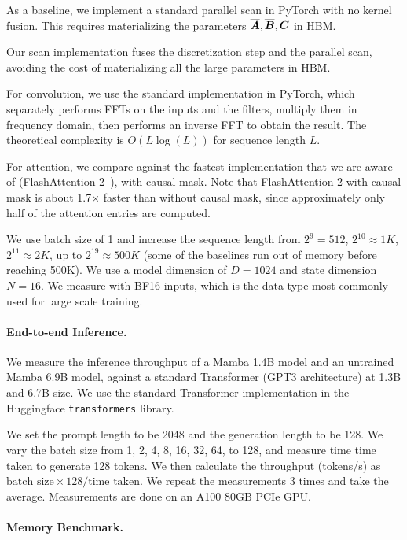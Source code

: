 As a baseline, we implement a standard parallel scan in PyTorch with no kernel fusion. This requires materializing the parameters $\overline{\bm{A}}, \overline{\bm{B}}, \bm{C}$ in HBM.

Our scan implementation fuses the discretization step and the parallel scan, avoiding the cost of materializing all the large parameters in HBM.

For convolution, we use the standard implementation in PyTorch, which separately performs FFTs on the inputs and the filters, multiply them in frequency domain, then performs an inverse FFT to obtain the result. The theoretical complexity is $O(L \log (L))$ for sequence length $L$.

For attention, we compare against the fastest implementation that we are aware of (FlashAttention-2~\citep{dao2023flashattention2}), with causal mask. Note that FlashAttention-2 with causal mask is about 1.7$\times$ faster than without causal mask, since approximately only half of the attention entries are computed.

We use batch size of 1 and increase the sequence length from $2^9=512$, $2^{10}\approx 1K$, $2^{11}\approx 2K$, up to $2^{19} \approx 500K$ (some of the baselines run out of memory before reaching 500K). 
We use a model dimension of $D = 1024$ and state dimension $N = 16$.
We measure with BF16 inputs, which is the data type most commonly used for large scale training. 

\paragraph{End-to-end Inference.} We measure the inference throughput of a Mamba 1.4B model and an untrained Mamba 6.9B model, against a standard Transformer (GPT3 architecture) at 1.3B and 6.7B size.
We use the standard Transformer implementation in the Huggingface \texttt{transformers} library. 

We set the prompt length to be 2048 and the generation length to be 128. We vary the batch size from 1, 2, 4, 8, 16, 32, 64, to 128, and measure time time taken to generate 128 tokens. We then calculate the throughput (tokens/s) as $\text{batch size} \times 128 / \text{time taken}$.
We repeat the measurements 3 times and take the average.
Measurements are done on an A100 80GB PCIe GPU.

\paragraph{Memory Benchmark.}

